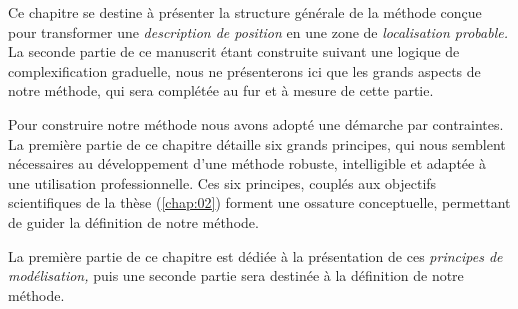 Ce chapitre se destine à présenter la structure générale de la méthode
conçue pour transformer une \emph{description de position} en une zone
de \emph{localisation probable.} La seconde partie de ce manuscrit
étant construite suivant une logique de complexification graduelle,
nous ne présenterons ici que les grands aspects de notre méthode, qui
sera complétée au fur et à mesure de cette partie.

Pour construire notre méthode nous avons adopté une démarche par
contraintes. La première partie de ce chapitre détaille six grands
principes, qui nous semblent nécessaires au développement d'une
méthode robuste, intelligible et adaptée à une utilisation
professionnelle. Ces six principes, couplés aux objectifs
scientifiques de la thèse (\autoref{chap:02}) forment une ossature
conceptuelle, permettant de guider la définition de notre méthode.

La première partie de ce chapitre est dédiée à la présentation de ces
\emph{principes de modélisation,} puis une seconde partie sera
destinée à la définition de notre méthode.
